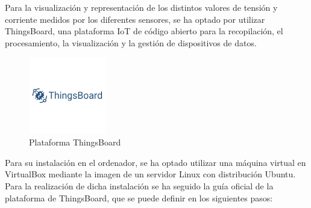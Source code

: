 Para la visualización y representación de los distintos valores de tensión y corriente medidos por los diferentes sensores, se ha optado por utilizar ThingsBoard, una plataforma IoT de código abierto para la recopilación, el procesamiento, la visualización y la gestión de dispositivos de datos.

\begin{figure}[H]
    \centering
    \includegraphics[width=0.3\textwidth]{images/3-software/3-2-2-thingsboard/LogoThingsboard.png}
    \caption{Plataforma ThingsBoard}
    \label{fig:3-2-2-ThingsBoard}
\end{figure}

Para su instalación en el ordenador, se ha optado utilizar una máquina virtual en VirtualBox mediante la imagen de un servidor Linux con distribución Ubuntu. Para la realización de dicha instalación se ha seguido la guía oficial de la plataforma de ThingsBoard, que se puede definir en los siguientes pasos: \cite{thingsboardInstallingThingsBoardCE}

